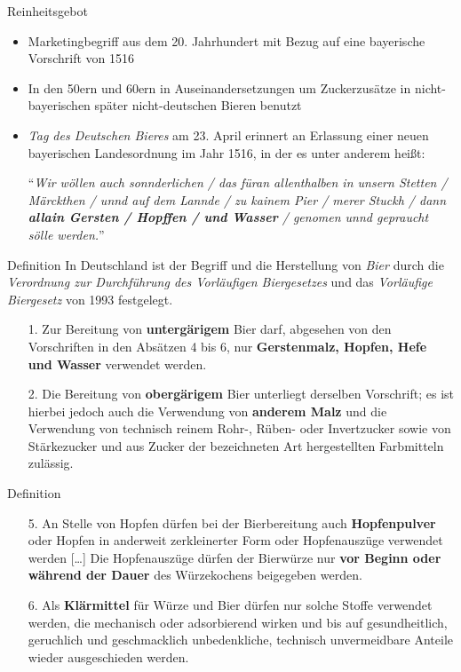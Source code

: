 \documentclass[9pt, ngerman]{beamer}
\begin{document}
\begin{frame}{Reinheitsgebot}
  \begin{itemize}
    \item Marketingbegriff aus dem 20. Jahrhundert mit Bezug auf eine
      bayerische Vorschrift von 1516
    \item In den 50ern und 60ern in Auseinandersetzungen um Zuckerzusätze
      in nicht-bayerischen später nicht-deutschen Bieren benutzt
    \item \emph{Tag des Deutschen Bieres} am 23. April erinnert an Erlassung
      einer neuen bayerischen Landesordnung im Jahr 1516, in der es unter
      anderem heißt:

      \enquote{\emph{Wir wöllen auch sonnderlichen / das füran
      allenthalben in unsern Stetten / Märckthen / unnd auf dem Lannde / zu
      kainem Pier / merer Stuckh / dann \textbf{allain Gersten / Hopffen / und
      Wasser} /
      genomen unnd gepraucht sölle werden.}}
  \end{itemize}
\end{frame}
\begin{frame}{Definition}
  In Deutschland ist der Begriff und die Herstellung von \emph{Bier} durch die
  \emph{Verordnung zur Durchführung des Vorläufigen Biergesetzes} und das
  \emph{Vorläufige Biergesetz} von 1993 festgelegt.

  \begin{enumerate}
    \item[1.] Zur Bereitung von \textbf{untergärigem} Bier darf, abgesehen von den
      Vorschriften in den Absätzen 4 bis 6, nur \textbf{Gerstenmalz, Hopfen, Hefe und
      Wasser} verwendet werden.
    \item[2.] Die Bereitung von \textbf{obergärigem} Bier unterliegt derselben
      Vorschrift; es ist hierbei jedoch auch die Verwendung von \textbf{anderem
      Malz} und die Verwendung von technisch reinem Rohr-, Rüben- oder
      Invertzucker sowie von Stärkezucker und aus Zucker der bezeichneten Art
      hergestellten Farbmitteln zulässig.
  \end{enumerate}
\end{frame}
\begin{frame}{Definition}
  \begin{enumerate}
    \item[5.] An Stelle von Hopfen dürfen bei der Bierbereitung auch
      \textbf{Hopfenpulver} oder Hopfen in anderweit zerkleinerter Form oder
      Hopfenauszüge verwendet werden [\dots] Die Hopfenauszüge dürfen der
      Bierwürze nur \textbf{vor Beginn oder während der Dauer} des Würzekochens
      beigegeben werden.

    \item[6.] Als \textbf{Klärmittel} für Würze und Bier dürfen nur solche
      Stoffe verwendet werden, die mechanisch oder adsorbierend wirken und bis
      auf gesundheitlich, geruchlich und geschmacklich unbedenkliche, technisch
      unvermeidbare Anteile wieder ausgeschieden werden.
  \end{enumerate}
\end{frame}
\end{document}
